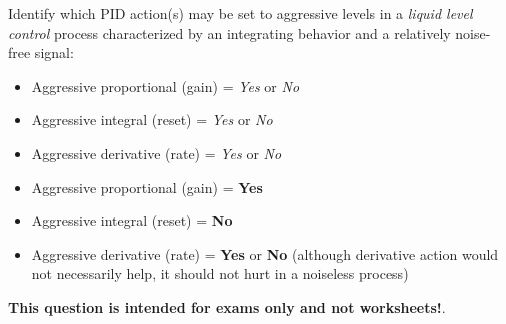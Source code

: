 

Identify which PID action(s) may be set to aggressive levels in a {\it liquid level control} process characterized by an integrating behavior and a relatively noise-free signal:

\begin{itemize}
\item{} Aggressive proportional (gain) = {\it Yes} or {\it No}
\vskip 10pt
\item{} Aggressive integral (reset) = {\it Yes} or {\it No} 
\vskip 10pt
\item{} Aggressive derivative (rate) = {\it Yes} or {\it No} 
\end{itemize}







\begin{itemize}
\item{} Aggressive proportional (gain) = {\bf Yes}
\vskip 10pt
\item{} Aggressive integral (reset) = {\bf No} 
\vskip 10pt
\item{} Aggressive derivative (rate) = {\bf Yes} or {\bf No} (although derivative action would not necessarily help, it should not hurt in a noiseless process)
\end{itemize}







{\bf This question is intended for exams only and not worksheets!}.


